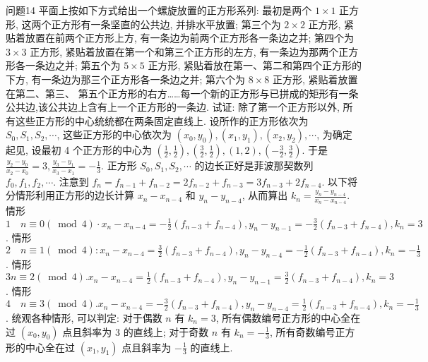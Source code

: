 问题14 平面上按如下方式给出一个螺旋放置的正方形系列: 最初是两个 $1 \times 1$ 正方形, 这两个正方形有一条坚直的公共边, 并排水平放置; 第三个为 $2 \times 2$ 正方形, 紧贴着放置在前两个正方形上方, 有一条边为前两个正方形各一条边之并; 第四个为 $3 \times 3$ 正方形, 紧贴着放置在第一个和第三个正方形的左方, 有一条边为那两个正方形各一条边之并; 第五个为 $5 \times 5$ 正方形, 紧贴着放在第一、第二和第四个正方形的下方, 有一条边为那三个正方形各一条边之并; 第六个为 $8 \times 8$ 正方形, 紧贴着放置在第二、第三、 第五个正方形的右方……每一个新的正方形与已拼成的矩形有一条公共边,该公共边上含有上一个正方形的一条边.
试证: 除了第一个正方形以外, 所有这些正方形的中心统统都在两条固定直线上.
设所作的正方形依次为 $S_0, S_1, S_2, \cdots$, 这些正方形的中心依次为 $\left(x_0, y_0\right),\left(x_1, y_1\right),\left(x_2, y_2\right), \cdots$, 为确定起见, 设最初 4 个正方形的中心为 $\left(\frac{1}{2}, \frac{1}{2}\right),\left(\frac{3}{2}, \frac{1}{2}\right),(1,2),\left(-\frac{3}{2}, \frac{3}{2}\right)$. 于是 $\frac{y_2-y_0}{x_2-x_0}=3, \frac{y_3-y_1}{x_3-x_1}= -\frac{1}{3}$. 正方形 $S_0, S_1, S_2, \cdots$ 的边长正好是菲波那契数列 $f_0, f_1, f_2, \cdots$. 注意到 $f_n=f_{n-1}+f_{n-2}=2 f_{n-2}+f_{n-3}=3 f_{n-3}+2 f_{n-4}$. 以下将分情形利用正方形的边长计算 $x_n-x_{n-4}$ 和 $y_n-y_{n-4}$, 从而算出 $k_n=\frac{y_n-y_{n-4}}{x_n-x_{n-4}}$.
情形 $1 \quad n \equiv 0(\bmod 4) \cdot x_n-x_{n-4}=-\frac{1}{2}\left(f_{n-3}+f_{n-4}\right), y_n-y_{n-1}= -\frac{3}{2}\left(f_{n-3}+f_{n-4}\right), k_n=3$.
情形 $2 \quad n \equiv 1(\bmod 4): x_n-x_{n-4}=\frac{3}{2}\left(f_{n-3}+f_{n-4}\right), y_n-y_{n-4}= -\frac{1}{2}\left(f_{n-3}+f_{n-4}\right), k_n=-\frac{1}{3}$.
情形 $3 n \equiv 2(\bmod 4) . x_n-x_{n-4}=\frac{1}{2}\left(f_{n-3}+f_{n-4}\right), y_n-y_{n-1}=\frac{3}{2}\left(f_{n-3}+ f_{n-4}\right), k_n=3$.
情形 $4 \quad n \equiv 3(\bmod 4) . x_n-x_{n-4}=-\frac{3}{2}\left(f_{n-3}+f_{n-4}\right), y_n-y_{n-4}= \frac{1}{2}\left(f_{n-3}+f_{n-4}\right), k_n=-\frac{1}{3}$.
统观各种情形, 可以判定: 对于偶数 $n$ 有 $k_n=3$, 所有偶数编号正方形的中心全在过 $\left(x_0, y_0\right)$ 点且斜率为 3 的直线上; 对于奇数 $n$ 有 $k_n=-\frac{1}{3}$, 所有奇数编号正方形的中心全在过 $\left(x_1, y_1\right)$ 点且斜率为 $-\frac{1}{3}$ 的直线上.



